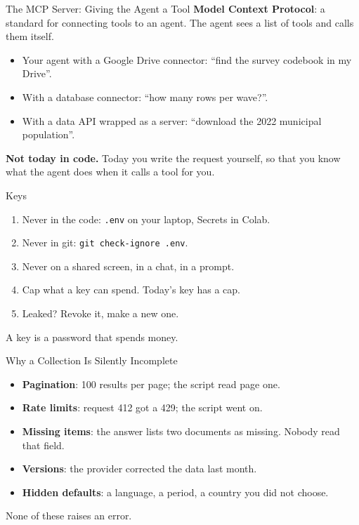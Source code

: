 \documentclass[svgnames,x11names,dvipsnames]{beamer}
\begin{document}
\begin{frame}{The MCP Server: Giving the Agent a Tool}
\small
\textbf{Model Context Protocol}: a standard for connecting tools to an agent. The agent sees a list of tools and calls them itself.

\vspace{0.4cm}
\begin{itemize}
    \setlength{\itemsep}{5pt}
    \item Your agent with a Google Drive connector: ``find the survey codebook in my Drive''.
    \item With a database connector: ``how many rows per wave?''.
    \item With a data API wrapped as a server: ``download the 2022 municipal population''.
\end{itemize}

\vspace{0.4cm}
\textbf{Not today in code.} Today you write the request yourself, so that you know what the agent does when it calls a tool for you.
\end{frame}

\begin{frame}{Keys}
\begin{enumerate}
    \setlength{\itemsep}{8pt}
    \item Never in the code: \texttt{.env} on your laptop, Secrets in Colab.
    \item Never in git: \texttt{git check-ignore .env}.
    \item Never on a shared screen, in a chat, in a prompt.
    \item Cap what a key can spend. Today's key has a cap.
    \item Leaked? Revoke it, make a new one.
\end{enumerate}

\vspace{0.5cm}
\centering
A key is a password that spends money.
\end{frame}

\begin{frame}{Why a Collection Is Silently Incomplete}
\begin{itemize}
    \setlength{\itemsep}{7pt}
    \item \textbf{Pagination}: 100 results per page; the script read page one.
    \item \textbf{Rate limits}: request 412 got a 429; the script went on.
    \item \textbf{Missing items}: the answer lists two documents as missing. Nobody read that field.
    \item \textbf{Versions}: the provider corrected the data last month.
    \item \textbf{Hidden defaults}: a language, a period, a country you did not choose.
\end{itemize}

\vspace{0.5cm}
None of these raises an error.
\end{frame}
\end{document}
